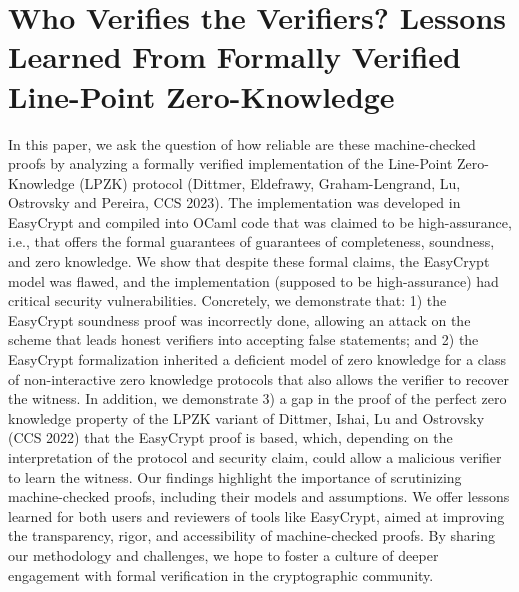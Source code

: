 \documentclass[11pt,oneside]{book}
\theoremstyle{definition}
\theoremstyle{remark}
\theoremstyle{plain}
\begin{document}
 \section{\cite{cryptoeprint:2025/1835} Who Verifies the Verifiers? Lessons Learned From Formally Verified Line-Point Zero-Knowledge}
 In this paper, we ask the question of how reliable are these machine-checked proofs by analyzing a formally verified implementation of the Line-Point Zero-Knowledge (LPZK) protocol (Dittmer, Eldefrawy, Graham-Lengrand, Lu, Ostrovsky and Pereira, CCS 2023). The implementation was developed in EasyCrypt and compiled into OCaml code that was claimed to be high-assurance, i.e., that offers the formal guarantees of guarantees of completeness, soundness, and zero knowledge.
We show that despite these formal claims, the EasyCrypt model was flawed, and the implementation (supposed to be high-assurance) had critical security vulnerabilities. Concretely, we demonstrate that: 1) the EasyCrypt soundness proof was incorrectly done, allowing an attack on the scheme that leads honest verifiers into accepting false statements; and 2) the EasyCrypt formalization inherited a deficient model of zero knowledge for a class of non-interactive zero knowledge protocols that also allows the verifier to recover the witness. In addition, we demonstrate 3) a gap in the proof of the perfect zero knowledge property of the LPZK variant of Dittmer, Ishai, Lu and Ostrovsky (CCS 2022) that the EasyCrypt proof is based, which, depending on the interpretation of the protocol and security claim, could allow a malicious verifier to learn the witness.
Our findings highlight the importance of scrutinizing machine-checked proofs, including their models and assumptions. We offer lessons learned for both users and reviewers of tools like EasyCrypt, aimed at improving the transparency, rigor, and accessibility of machine-checked proofs. By sharing our methodology and challenges, we hope to foster a culture of deeper engagement with formal verification in the cryptographic community.
\end{document}

